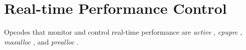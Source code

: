 \begin{comment}
\documentclass[10pt]{article}
\usepackage{fullpage, graphicx, url}
\setlength{\parskip}{1ex}
\setlength{\parindent}{0ex}
\title{Real-time Performance Control}



\begin{tabular}{ccc}
The Alternative Csound Reference Manual & & \\
Previous &Instrument Control &Next

\end{tabular}

\end{comment}
\section{Real-time Performance Control}


  Opcodes that monitor and control real-time performance are \emph{active}
, \emph{cpuprc}
, \emph{maxalloc}
, and \emph{prealloc}
. 


\begin{comment}
\begin{tabular}{lcr}
Previous &Home &Next \\
Program Flow Control &Up &Reinitialization

\end{tabular}



\end{comment}
